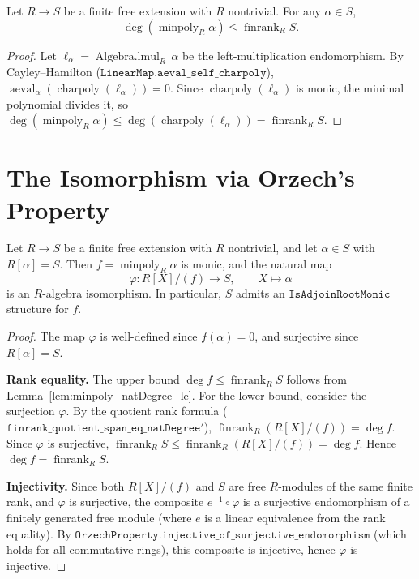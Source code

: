 \begin{lemma}
  \label{lem:minpoly_natDegree_le}
  \leanok
  Let $R \to S$ be a finite free extension with $R$ nontrivial.
  For any $\alpha \in S$,
  \[
    \deg(\operatorname{minpoly}_R \alpha) \le \operatorname{finrank}_R S.
  \]
\end{lemma}

\begin{proof}
  \leanok
  Let $\ell_\alpha = \operatorname{Algebra.lmul}_R\, \alpha$ be the
  left-multiplication endomorphism.  By Cayley--Hamilton
  ($\mathtt{LinearMap.aeval\_self\_charpoly}$),
  $\operatorname{aeval}_\alpha(\operatorname{charpoly}(\ell_\alpha)) = 0$.
  Since $\operatorname{charpoly}(\ell_\alpha)$ is monic, the minimal polynomial
  divides it, so
  $\deg(\operatorname{minpoly}_R \alpha) \le \deg(\operatorname{charpoly}(\ell_\alpha)) = \operatorname{finrank}_R S$.
  \end{proof}

\section{The Isomorphism via Orzech's Property}

\begin{theorem}
  \label{thm:mkOfAdjoinEqTop}
  \leanok
  Let $R \to S$ be a finite free extension with $R$ nontrivial,
  and let $\alpha \in S$ with $R[\alpha] = S$.
  Then $f = \operatorname{minpoly}_R \alpha$ is monic, and the natural map
  \[
    \varphi \colon R[X]/(f) \longrightarrow S, \qquad X \mapsto \alpha
  \]
  is an $R$-algebra isomorphism. In particular, $S$ admits an
  $\mathtt{IsAdjoinRootMonic}$ structure for $f$.
\end{theorem}

\begin{proof}
  \leanok
  The map $\varphi$ is well-defined since $f(\alpha) = 0$, and surjective
  since $R[\alpha] = S$.

  \textbf{Rank equality.}
  The upper bound $\deg f \le \operatorname{finrank}_R S$
  follows from Lemma~\ref{lem:minpoly_natDegree_le}.
  For the lower bound, consider the surjection $\varphi$.
  By the quotient rank formula
  ($\mathtt{finrank\_quotient\_}\allowbreak\mathtt{span\_eq\_natDegree'}$),
  $\operatorname{finrank}_R(R[X]/(f)) = \deg f$.
  Since $\varphi$ is surjective,
  $\operatorname{finrank}_R S \le \operatorname{finrank}_R(R[X]/(f)) = \deg f$.
  Hence $\deg f = \operatorname{finrank}_R S$.

  \textbf{Injectivity.}
  Since both $R[X]/(f)$ and $S$ are free $R$-modules of the same finite rank,
  and $\varphi$ is surjective, the composite
  $e^{-1} \circ \varphi$ is a surjective endomorphism of a finitely generated
  free module (where $e$ is a linear equivalence from the rank equality).
  By $\mathtt{OrzechProperty.}\allowbreak\mathtt{injective\_of\_surjective\_endomorphism}$
  (which holds for all commutative rings), this composite is injective,
  hence $\varphi$ is injective.
\end{proof}


